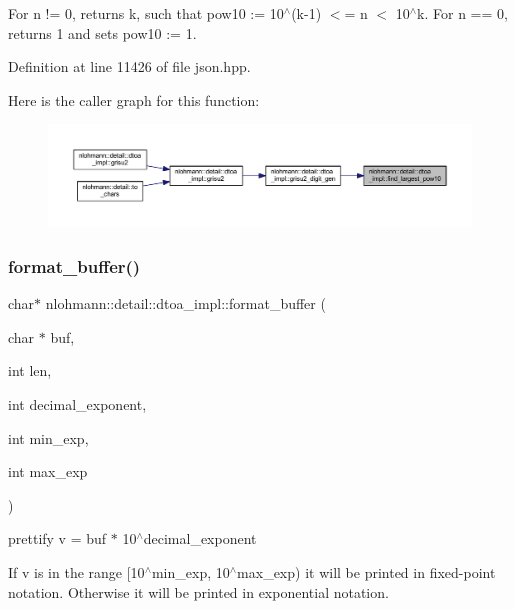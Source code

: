 For n != 0, returns k, such that pow10 \+:= 10$^\wedge$(k-\/1) $<$= n $<$ 10$^\wedge$k. For n == 0, returns 1 and sets pow10 \+:= 1. 

Definition at line 11426 of file json.\+hpp.

Here is the caller graph for this function\+:
\nopagebreak
\begin{figure}[H]
\begin{center}
\leavevmode
\includegraphics[width=350pt]{namespacenlohmann_1_1detail_1_1dtoa__impl_a36ded358763b5dbcea9867660fbe4e28_icgraph}
\end{center}
\end{figure}
\mbox{\label{namespacenlohmann_1_1detail_1_1dtoa__impl_a12c1c5d8b46ba9702186445e73f86afe}} 
\subsubsection{\texorpdfstring{format\_buffer()}{format\_buffer()}}
{\footnotesize\ttfamily char$\ast$ nlohmann\+::detail\+::dtoa\+\_\+impl\+::format\+\_\+buffer (\begin{DoxyParamCaption}\item[{char $\ast$}]{buf,  }\item[{int}]{len,  }\item[{int}]{decimal\+\_\+exponent,  }\item[{int}]{min\+\_\+exp,  }\item[{int}]{max\+\_\+exp }\end{DoxyParamCaption})\hspace{0.3cm}{\ttfamily [inline]}}



prettify v = buf $\ast$ 10$^\wedge$decimal\+\_\+exponent 

If v is in the range \mbox{[}10$^\wedge$min\+\_\+exp, 10$^\wedge$max\+\_\+exp) it will be printed in fixed-\/point notation. Otherwise it will be printed in exponential notation.

